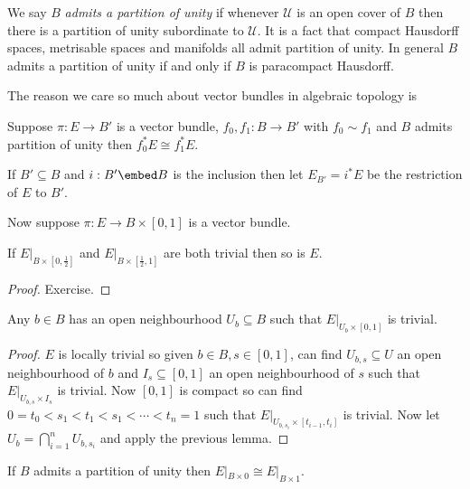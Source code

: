 \documentclass[a4paper]{article}
\begin{document}
We say \(B\) \emph{admits a partition of unity} if whenever \(\mathcal U\) is an open cover of \(B\) then there is a partition of unity subordinate to \(\mathcal U\). It is a fact that compact Hausdorff spaces, metrisable spaces and manifolds all admit partition of unity. In general \(B\) admits a partition of unity if and only if \(B\) is paracompact Hausdorff.

The reason we care so much about vector bundles in algebraic topology is

\begin{theorem}
  \label{thm:pullback by homotopic maps are isomorphic}
  Suppose \(\pi: E \to B'\) is a vector bundle, \(f_0, f_1: B \to B'\) with \(f_0 \sim f_1\) and \(B\) admits partition of unity then \(f_0^*E \cong f_1^*E\).
\end{theorem}

\begin{notation}
  If \(B' \subseteq B\) and \(i: B' \embed B\) is the inclusion then let \(E_{B'} = i^*E\) be the restriction of \(E\) to \(B'\).
\end{notation}

Now suppose \(\pi: E \to B \times [0, 1]\) is a vector bundle.

\begin{lemma}
  If \(E|_{B \times [0, \frac{1}{2}]}\) and \(E|_{B \times [\frac{1}{2}, 1]}\) are both trivial then so is \(E\).
\end{lemma}

\begin{proof}
  Exercise.
\end{proof}

\begin{lemma}
  Any \(b \in B\) has an open neighbourhood \(U_b \subseteq B\) such that \(E|_{U_b \times [0, 1]}\) is trivial.
\end{lemma}

\begin{proof}
  \(E\) is locally trivial so given \(b \in B, s \in [0, 1]\), can find \(U_{b, s} \subseteq U\) an open neighbourhood of \(b\) and \(I_s \subseteq [0, 1]\) an open neighbourhood of \(s\) such that \(E|_{U_{b, s} \times I_s}\) is trivial. Now \([0, 1]\) is compact so can find \(0 = t_0 < s_1 < t_1 < s_1 < \cdots < t_n = 1\) such that \(E|_{U_{b, s_i} \times [t_{i - 1}, t_i]}\) is trivial. Now let \(U_b = \bigcap_{i = 1}^n U_{b, s_i}\) and apply the previous lemma.
\end{proof}

\begin{proposition}
  If \(B\) admits a partition of unity then \(E|_{B\times 0} \cong E|_{B \times 1}\).
\end{proposition}
\end{document}
